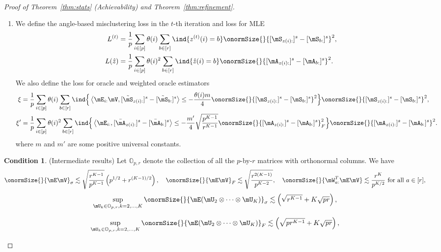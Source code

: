 \documentclass[lettersize,onecolumn,journal]{IEEEtran}
\theoremstyle{definition}
\theoremstyle{definition}
\newtheorem{condition}{Condition}
\newcommand{\of}[1]{\left(#1\right)}
\newcommand{\ang}[1]{\left\langle#1\right\rangle}
\begin{document}
\begin{proof}[Proof of Theorem~\ref{thm:stats} (Achievability) and Theorem~\ref{thm:refinement}]
{\begin{enumerate}[wide]
    \item We define the angle-based misclustering loss in the $t$-th iteration and loss for MLE
    \begin{align}
        L^{(t)} &= \frac{1}{p}  \sum_{i \in [p]} \theta(i) \sum_{b \in [r]}  \ind \{ z^{(t)}(i) = b \} \onormSize{}{ [ \mS_{ z(i):}  ]^s - [ \mS_{b:}  ]^s  }^2, \\
         L(\hat z)& = \frac{1}{p} \sum_{i \in [p]} \theta(i)^2 \sum_{b \in [r]} \ind\{ \hat z(i) = b\} \onormSize{}{[\mA_{z(i):}]^s - [\mA_{b:}]^s}^2.
    \end{align}
    We also define the loss for oracle and weighted oracle estimators
    \begin{align}
         \xi & = \frac{1}{p} \sum_{i \in [p]} \theta(i) \sum_{b \in [r]} \ind \Big\{\ang{ \mE_{i:} \mV, [  \tilde \mS_{z(i):} ]^s - [  \tilde \mS_{b:} ]^s}  \leq - \frac{ \theta(i) m}{4} \onormSize{}{ [ \mS_{z(i):}  ]^s - [ \mS_{b:}  ]^s  }^2 \Big\} \onormSize{}{ [ \mS_{z(i):}  ]^s - [ \mS_{ b:}  ]^s  }^2,\\
         \xi' & = \frac{1}{p} \sum_{i \in [p]} \theta(i)^2 \sum_{b \in [r]} \ind \Big\{\ang{\mE_{i:}, [\bar \mA_{z(i):}]^s - [\bar \mA_{b:}]^s }  \leq - \frac{m'}{4}  \sqrt{\frac{p^{K-1}}{r^{K-1}}} \onormSize{}{ [\mA_{z(i):}]^s -  [\mA_{b:}]^s  }_F^2 \Big\}  \onormSize{}{[\mA_{z(i):}]^s - [\mA_{b:}]^s}^2.
    \end{align}
    where $m$ and $m'$ are some positive universal constants.
\end{enumerate}

\begin{condition}(Intermediate results) \label{cond:origin} Let $\mathbb{O}_{p, r}$ denote the collection of all the $p$-by-$r$ matrices with orthonormal columns. We have 
\begin{equation}\label{eq:cond1}
    \onormSize{}{\mE \mV}_\sigma \lesssim \sqrt{\frac{r^{K-1}}{p^{K-1}}} \of{ p ^{1/2}+ r^{(K-1)/2}}, \quad \onormSize{}{\mE \mV}_F \lesssim \sqrt{\frac{ r^{2(K-1)}}{p^{K-2}}},\quad \onormSize{}{ \mW_{a:}^T \mE \mV} \lesssim \frac{r^K}{p^{K/2}} \text{ for all }a \in [r], 
\end{equation}
\begin{equation}\label{eq:cond2}
    \sup_{ \mU_k \in \mathbb{O}_{p, r}, k = 2,\ldots, K } \onormSize{}{ \mE (\mU_{2} \otimes \cdots \otimes \mU_K)}_\sigma \lesssim \of{ \sqrt{r^{K-1}} + K\sqrt{pr}},
\end{equation}

\begin{equation}\label{eq:cond3}
    \sup_{ \mU_k \in \mathbb{O}_{p, r}, k = 2,\ldots, K } \onormSize{}{ \mE (\mU_{2} \otimes \cdots \otimes \mU_K)}_F \lesssim \of{ \sqrt{pr^{K-1}} + K\sqrt{pr}},
\end{equation}


\end{condition}}
\end{proof}
\end{document}
